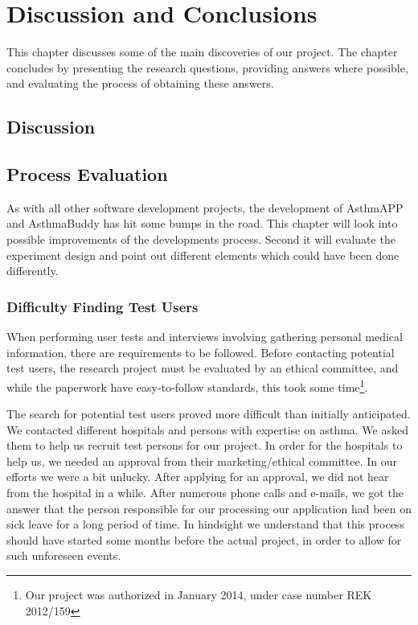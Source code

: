 \chapter{Discussion and Conclusions}
\label{chp:masterconclusion}

This chapter discusses some of the main discoveries of our project. The chapter concludes by presenting the research questions, providing answers where possible, and evaluating the process of obtaining these answers. 

\section{Discussion}
\label{sec:discussion}




\section{Process Evaluation}
\label{sec:processevaluation}
As with all other software development projects, the development of AsthmAPP and AsthmaBuddy has hit some bumps in the road. This chapter will look into possible improvements of the developments process. Second it will evaluate the experiment design and point out different elements which could have been done differently.

\subsection{Difficulty Finding Test Users}
\label{sec:difficultyfindingtestusers}
When performing user tests and interviews involving gathering personal medical information, there are requirements to be followed. Before contacting potential test users, the research project must be evaluated by an ethical committee, and while the paperwork have easy-to-follow standards, this took some time\footnote{Our project was authorized in January 2014, under case number REK 2012/159}. 

The search for potential test users proved more difficult than initially anticipated. We contacted different hospitals and persons with expertise on asthma. We asked them to help us recruit test persons for our project. In order for the hospitals to help us, we needed an approval from their marketing/ethical committee. In our efforts we were a bit unlucky. After applying for an approval, we did not hear from the hospital in a while. After numerous phone calls and e-mails, we got the answer that the person responsible for our processing our application had been on sick leave for a long period of time. In hindsight we understand that this process should have started some months before the actual project, in order to allow for such unforeseen events. 

